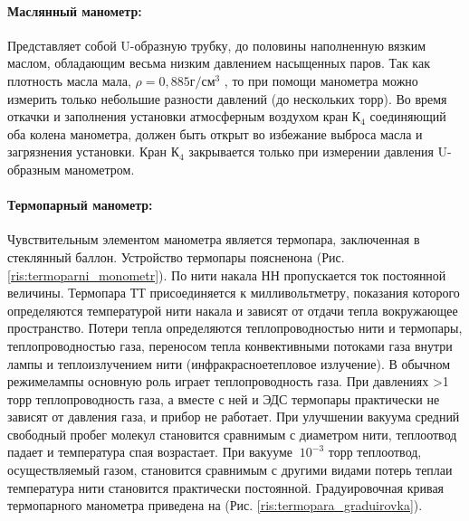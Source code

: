 \documentclass[a4paper, 12pt]{article}
\begin{document}
    \paragraph{Маслянный манометр:}
    Представляет собой U-образную трубку, до половины наполненную вязким маслом, обладающим весьма низким давлением насыщенных паров. Так как плотность масла мала, $\rho = 0,885 г/см^3$ , то при помощи манометра можно измерить только небольшие разности давлений (до нескольких торр). Во время откачки и заполнения установки атмосферным воздухом кран $К_4$ соединяющий оба колена манометра, должен быть открыт во избежание выброса масла и загрязнения установки. Кран $К_4$ закрывается только при измерении давления U-образным манометром.


    \newpage

    \paragraph{Термопарный манометр:}
    Чувствительным элементом манометра является термопара, заключенная в стеклянный баллон. Устройство термопары поясненона (Рис. \ref{ris:termoparni_monometr}). По нити накала НН пропускается ток постоянной величины. Термопара ТТ присоединяется к милливольтметру, показания которого определяются температурой нити накала и зависят от отдачи тепла вокружающее пространство. Потери тепла определяются теплопроводностью нити и термопары, теплопроводностью газа, переносом тепла конвективными потоками газа внутри лампы и теплоизлучением нити (инфракрасноетепловое излучение). В обычном режимелампы основную роль играет теплопроводность газа. При давлениях >1 торр теплопроводность газа, а вместе с ней и ЭДС термопары практически не зависят от давления газа, и прибор не работает. При улучшении вакуума средний свободный пробег молекул становится сравнимым с диаметром нити, теплоотвод падает и температура спая возрастает. При вакууме $~10^{-3}$ торр теплоотвод, осуществляемый газом, становится сравнимым с другими видами потерь теплаи температура нити становится практически постоянной. Градуировочная кривая термопарного манометра приведена на (Рис. \ref{ris:termopara_graduirovka}).
\end{document}
